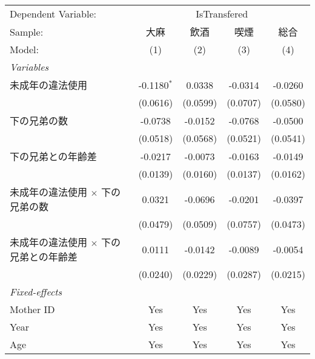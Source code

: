 \documentclass{article}
\begin{document}
\begin{landscape}


\begingroup
\centering
\begin{threeparttable}[b]
   \begin{tabular}{lcccc}
      \tabularnewline \midrule \midrule
      Dependent Variable: & \multicolumn{4}{c}{IsTransfered}\\
      Sample:                                       & 大麻          & 飲酒     & 喫煙     & 総合 \\   
      Model:                                        & (1)           & (2)      & (3)      & (4)\\  
      \midrule
      \emph{Variables}\\
      未成年の違法使用                              & -0.1180$^{*}$ & 0.0338   & -0.0314  & -0.0260\\   
                                                    & (0.0616)      & (0.0599) & (0.0707) & (0.0580)\\   
      下の兄弟の数                                  & -0.0738       & -0.0152  & -0.0768  & -0.0500\\   
                                                    & (0.0518)      & (0.0568) & (0.0521) & (0.0541)\\   
      下の兄弟との年齢差                            & -0.0217       & -0.0073  & -0.0163  & -0.0149\\   
                                                    & (0.0139)      & (0.0160) & (0.0137) & (0.0162)\\   
      未成年の違法使用 $\times$ 下の兄弟の数        & 0.0321        & -0.0696  & -0.0201  & -0.0397\\   
                                                    & (0.0479)      & (0.0509) & (0.0757) & (0.0473)\\   
      未成年の違法使用 $\times$ 下の兄弟との年齢差  & 0.0111        & -0.0142  & -0.0089  & -0.0054\\   
                                                    & (0.0240)      & (0.0229) & (0.0287) & (0.0215)\\   
      \midrule
      \emph{Fixed-effects}\\
      Mother ID                                     & Yes           & Yes      & Yes      & Yes\\  
      Year                                          & Yes           & Yes      & Yes      & Yes\\  
      Age                                           & Yes           & Yes      & Yes      & Yes\\  

\end{tabular}
\end{threeparttable}
\end{landscape}
\end{document}
